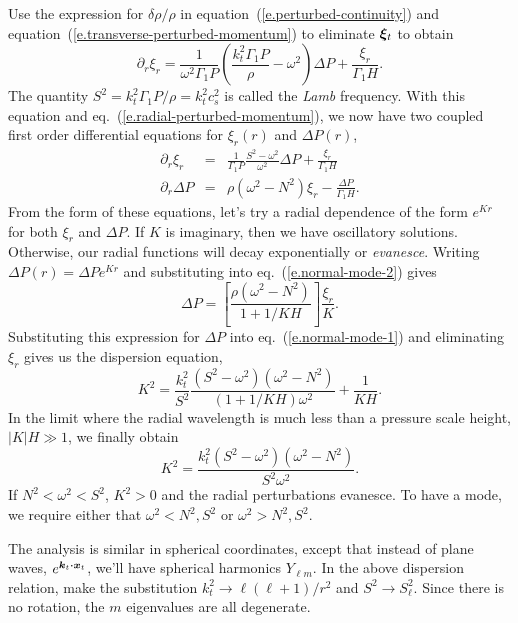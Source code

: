 Use the expression for $\delta\rho/\rho$ in equation~(\ref{e.perturbed-continuity}) and  equation~(\ref{e.transverse-perturbed-momentum}) to eliminate $\boldsymbol{\xi}_{t}$ to obtain
\begin{equation}
\partial_{r} \xi_{r} = \frac{1}{\omega^{2}\Gamma_{1}P} \left(\frac{k_{t}^{2}\Gamma_{1}P}{\rho} - \omega^{2}\right)\Delta P + \frac{\xi_{r}}{\Gamma_{1}H}.
\end{equation}
The quantity $S^{2} = k_{t}^{2} \Gamma_{1}P/\rho = k_{t}^{2}c_{s}^{2}$ is called the \emph{Lamb} frequency. 
With this equation and eq.~(\ref{e.radial-perturbed-momentum}), we now have two coupled first order differential equations for $\xi_{r}(r)$ and $\Delta P(r)$,
\begin{eqnarray}
\label{e.normal-mode-1}
\partial_{r}\xi_{r} &=& \frac{1}{\Gamma_{1}P} \frac{S^{2}-\omega^{2}}{\omega^{2}}\Delta P + \frac{\xi_{r}}{\Gamma_{1}H}\\
\label{e.normal-mode-2}
\partial_{r}\Delta P &=& \rho(\omega^{2}-N^{2})\xi_{r} - \frac{\Delta P}{\Gamma_{1}H}.
\end{eqnarray}
From the form of these equations, let's try a radial dependence of the form $e^{Kr}$ for both $\xi_{r}$ and $\Delta P$.  If $K$ is imaginary, then we have oscillatory solutions.  Otherwise, our radial functions will decay exponentially or \emph{evanesce}.  Writing $\Delta P (r) = \Delta P e^{Kr}$ and substituting into eq.~(\ref{e.normal-mode-2}) gives
\[
\Delta P = \left[\frac{\rho(\omega^{2}-N^{2})}{1 + 1/KH}\right] \frac{\xi_{r}}{K}.
\]
Substituting this expression for $\Delta P$ into eq.~(\ref{e.normal-mode-1}) and eliminating $\xi_{r}$ gives us the dispersion equation,
\begin{equation}\label{e.full-dispersion-equation}
K^{2} = \frac{k_{t}^{2}}{S^{2}} \frac{(S^{2} - \omega^{2})(\omega^{2}-N^{2})}{(1 + 1/KH)\omega^{2}} + \frac{1}{KH}.
\end{equation}
In the limit where the radial wavelength is much less than a pressure scale height, $|K|H\gg 1$, we finally obtain
\begin{equation}\label{e.dispersion-equation}
K^{2} = \frac{k_{t}^{2}(S^{2} - \omega^{2})(\omega^{2}-N^{2})}{S^{2}\omega^{2}}.
\end{equation}
If $N^{2} < \omega^{2} < S^{2}$, $K^{2} > 0$ and the radial perturbations evanesce.  To have a mode, we require either that $\omega^{2} < N^{2}, S^{2}$ or $\omega^{2} > N^{2}, S^{2}$.  

The analysis is similar in spherical coordinates, except that instead of plane waves, $e^{\boldsymbol{k}_{t}\boldsymbol{\cdot}\boldsymbol{x}_{t}}$, we'll have spherical harmonics $Y_{\ell m}$.  In the above dispersion relation, make the substitution $k_{t}^{2} \to \ell(\ell + 1)/r^{2}$ and $S^{2} \to S^{2}_{\ell}$.  Since there is no rotation, the $m$ eigenvalues are all degenerate.